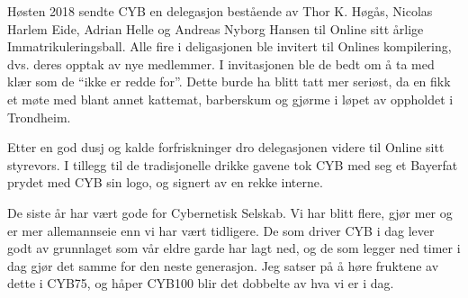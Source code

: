 Høsten 2018 sendte CYB en delegasjon bestående av Thor K. Høgås, Nicolas Harlem Eide, Adrian Helle og Andreas Nyborg Hansen til Online sitt årlige Immatrikuleringsball. Alle fire i deligasjonen ble invitert til Onlines kompilering, dvs. deres opptak av nye medlemmer. I invitasjonen ble de bedt om å ta med klær som de ``ikke er redde for''. Dette burde ha blitt tatt mer seriøst, da en fikk et møte med blant annet kattemat, barberskum og gjørme i løpet av oppholdet i Trondheim. 

Etter en god dusj og kalde forfriskninger dro delegasjonen videre til Online sitt styrevors. I tillegg til de tradisjonelle drikke gavene tok CYB med seg et Bayerfat prydet med CYB sin logo, og signert av en rekke interne. 

De siste år har vært gode for Cybernetisk Selskab. Vi har blitt flere, gjør mer og er mer allemannseie enn vi har vært tidligere. De som driver CYB i dag lever godt av grunnlaget som vår eldre garde har lagt ned, og de som legger ned timer i dag gjør det samme for den neste generasjon. Jeg satser på å høre fruktene av dette i CYB75, og håper CYB100 blir det dobbelte av hva vi er i dag. 

